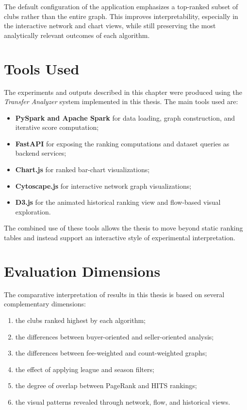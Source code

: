 The default configuration of the application emphasizes a top-ranked subset of clubs rather than the entire graph. This improves interpretability, especially in the interactive network and chart views, while still preserving the most analytically relevant outcomes of each algorithm.


\section{Tools Used}
\label{sec:results_tools}

The experiments and outputs described in this chapter were produced using the \textit{Transfer Analyzer} system implemented in this thesis. The main tools used are:
\begin{itemize}
    \item \textbf{PySpark and Apache Spark} for data loading, graph construction, and iterative score computation;
    \item \textbf{FastAPI} for exposing the ranking computations and dataset queries as backend services;
    \item \textbf{Chart.js} for ranked bar-chart visualizations;
    \item \textbf{Cytoscape.js} for interactive network graph visualizations;
    \item \textbf{D3.js} for the animated historical ranking view and flow-based visual exploration.
\end{itemize}

The combined use of these tools allows the thesis to move beyond static ranking tables and instead support an interactive style of experimental interpretation.


\section{Evaluation Dimensions}
\label{sec:results_eval_dimensions}

The comparative interpretation of results in this thesis is based on several complementary dimensions:
\begin{enumerate}
    \item the clubs ranked highest by each algorithm;
    \item the differences between buyer-oriented and seller-oriented analysis;
    \item the differences between fee-weighted and count-weighted graphs;
    \item the effect of applying league and season filters;
    \item the degree of overlap between PageRank and HITS rankings;
    \item the visual patterns revealed through network, flow, and historical views.
\end{enumerate}

